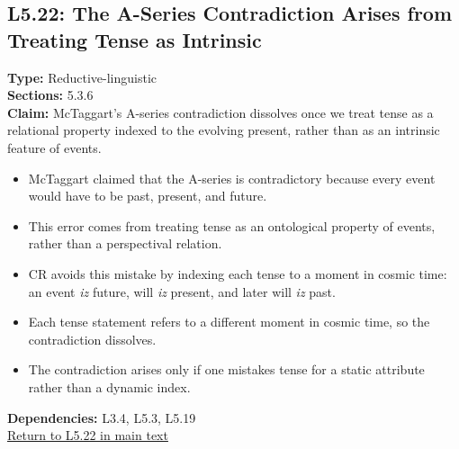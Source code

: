 \documentclass[12pt]{book}
\newcommand{\returnlink}[1]{\hyperref[logic:#1]{Return to #1 in main text}\xspace}
\begin{document}
\subsection*{L5.22: The A-Series Contradiction Arises from Treating Tense as Intrinsic}
\label{appendix:L5.22}
\textbf{Type:} Reductive-linguistic \\
\textbf{Sections:} 5.3.6 \\
\textbf{Claim:} McTaggart's A-series contradiction dissolves once we treat tense as a relational property indexed to the evolving present, rather than as an intrinsic feature of events.
\begin{itemize}
  \item McTaggart claimed that the A-series is contradictory because every event would have to be past, present, and future.
  \item This error comes from treating tense as an ontological property of events, rather than a perspectival relation.
  \item CR avoids this mistake by indexing each tense to a moment in cosmic time: an event \textit{iz} future, will \textit{iz} present, and later will \textit{iz} past.
  \item Each tense statement refers to a different moment in cosmic time, so the contradiction dissolves.
  \item The contradiction arises only if one mistakes tense for a static attribute rather than a dynamic index.
\end{itemize}
\textbf{Dependencies:} L3.4, L5.3, L5.19 \\
\returnlink{L5.22}
\end{document}
